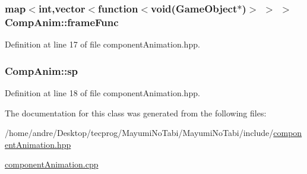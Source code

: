 \hypertarget{class_comp_anim_aa91a04d8c492ee48b82053250f23beaa}{
\subsubsection[{frame\-Func}]{\setlength{\rightskip}{0pt plus 5cm}map$<${\bf int},vector$<$function$<${\bf void}({\bf Game\-Object}$\ast$)$>$ $>$ $>$ Comp\-Anim\-::frame\-Func}}\label{class_comp_anim_aa91a04d8c492ee48b82053250f23beaa}


Definition at line 17 of file component\-Animation.\-hpp.

\hypertarget{class_comp_anim_a3e2ac4843d1760fa886462f73dfdadc9}{
\subsubsection[{sp}]{ Comp\-Anim\-::sp}}\label{class_comp_anim_a3e2ac4843d1760fa886462f73dfdadc9}


Definition at line 18 of file component\-Animation.\-hpp.



The documentation for this class was generated from the following files\-:\begin{DoxyCompactItemize}
\item 
/home/andre/\-Desktop/tecprog/\-Mayumi\-No\-Tabi/\-Mayumi\-No\-Tabi/include/\hyperlink{component_animation_8hpp}{component\-Animation.\-hpp}\item 
\hyperlink{component_animation_8cpp}{component\-Animation.\-cpp}\end{DoxyCompactItemize}
